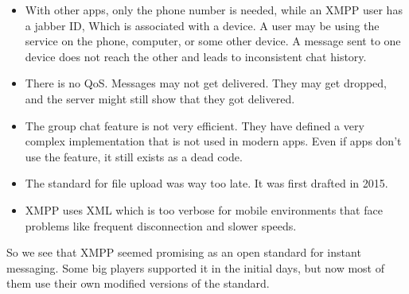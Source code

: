 \documentclass[11pt, conference, a4paper]{IEEEtran}
\begin{document}
\begin{itemize}
\item With other apps, only the phone number is needed, while an XMPP user has a jabber ID, Which is associated with a device. A user may be using the service on the phone, computer, or some other device. A message sent to one device does not reach the other and leads to inconsistent chat history.
\item There is no QoS. Messages may not get delivered. They may get dropped, and the server might still show that they got delivered.
\item The group chat feature is not very efficient. They have defined a very complex implementation that is not used in modern apps. Even if apps don't use the feature, it still exists as a dead code.
\item The standard for file upload was way too late. It was first drafted in 2015.
\item XMPP uses XML which is too verbose for mobile environments that face problems like frequent disconnection and slower speeds. 
\end{itemize}
So we see that XMPP seemed promising as an open standard for instant messaging. Some big players supported it in the initial days, but now most of them use their own modified versions of the standard.
\end{document}
